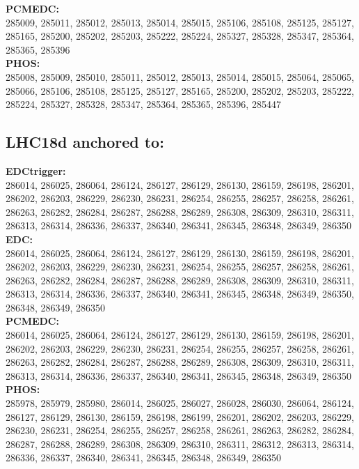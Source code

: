  \textbf{PCMEDC:}\\
 285009, 285011, 285012, 285013, 285014, 285015, 285106, 285108, 285125, 285127, 285165, 285200, 285202, 285203, 285222, 285224, 285327, 285328, 285347, 285364, 285365, 285396  \\

 \textbf{PHOS:}\\
285008, 285009, 285010, 285011, 285012, 285013, 285014, 285015, 285064, 285065, 285066, 285106, 285108, 285125, 285127, 285165, 285200, 285202, 285203, 285222, 285224, 285327, 285328, 285347, 285364, 285365, 285396, 285447\\

 \subsection{LHC18d anchored to:  }

 \textbf{EDCtrigger:}\\
 286014, 286025, 286064, 286124, 286127, 286129, 286130, 286159, 286198, 286201, 286202, 286203, 286229, 286230, 286231, 286254, 286255, 286257, 286258, 286261, 286263, 286282, 286284, 286287, 286288, 286289, 286308, 286309, 286310, 286311, 286313, 286314, 286336, 286337, 286340, 286341, 286345, 286348, 286349, 286350\\

 \textbf{EDC:}\\
 286014, 286025, 286064, 286124, 286127, 286129, 286130, 286159, 286198, 286201, 286202, 286203, 286229, 286230, 286231, 286254, 286255, 286257, 286258, 286261, 286263, 286282, 286284, 286287, 286288, 286289, 286308, 286309, 286310, 286311, 286313, 286314, 286336, 286337, 286340, 286341, 286345, 286348, 286349, 286350, 286348, 286349, 286350 \\


 \textbf{PCMEDC:}\\
 286014, 286025, 286064, 286124, 286127, 286129, 286130, 286159, 286198, 286201, 286202, 286203, 286229, 286230, 286231, 286254, 286255, 286257, 286258, 286261, 286263, 286282, 286284, 286287, 286288, 286289, 286308, 286309, 286310, 286311, 286313, 286314, 286336, 286337, 286340, 286341, 286345, 286348, 286349, 286350 \\

 \textbf{PHOS:}\\
285978, 285979, 285980, 286014, 286025, 286027, 286028, 286030, 286064, 286124, 286127, 286129, 286130, 286159, 286198, 286199, 286201, 286202, 286203, 286229, 286230, 286231, 286254, 286255, 286257, 286258, 286261, 286263, 286282, 286284, 286287, 286288, 286289, 286308, 286309, 286310, 286311, 286312, 286313, 286314, 286336, 286337, 286340, 286341, 286345, 286348, 286349, 286350\\

